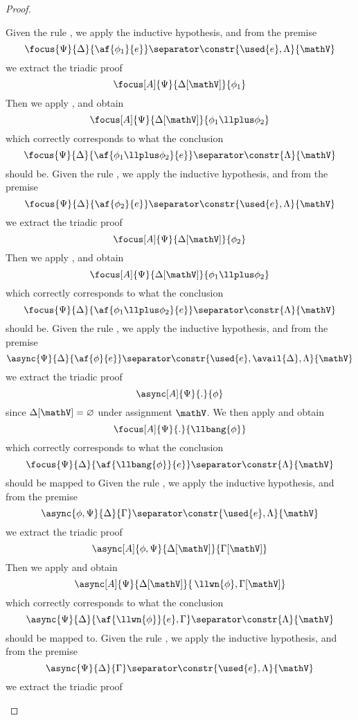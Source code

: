 \begin{proof}
\begin{itemize}
		\indCase{\displayplus[L]} Given the rule \derRule{\displayplus[L]}, we apply the inductive hypothesis, and from the premise
			$$ \focus{\Psi}{\Delta}{\af{\phi_1}{e}} \separator \constr{\used{e}, \Lambda}{\mathV}$$
			we extract the triadic proof
			$$ \focus[A]{\Psi}{\Delta[\mathV]}{\phi_1} $$
			Then we apply \derRule[A]{\displayplus[L]}, and obtain
			$$ \focus[A]{\Psi}{\Delta[\mathV]}{\phi_1 \llplus \phi_2} $$
			which correctly corresponds to what the conclusion
			$$ \focus{\Psi}{\Delta}{\af{\phi_1 \llplus \phi_2}{e}} \separator \constr{\Lambda}{\mathV} $$
			should be.
		\indCase{\displayplus[R]} Given the rule \derRule{\displayplus[R]}, we apply the inductive hypothesis, and from the premise
			$$ \focus{\Psi}{\Delta}{\af{\phi_2}{e}} \separator \constr{\used{e}, \Lambda}{\mathV}$$
			we extract the triadic proof
			$$ \focus[A]{\Psi}{\Delta[\mathV]}{\phi_2} $$
			Then we apply \derRule[A]{\displayplus[R]}, and obtain
			$$ \focus[A]{\Psi}{\Delta[\mathV]}{\phi_1 \llplus \phi_2} $$
			which correctly corresponds to what the conclusion
			$$ \focus{\Psi}{\Delta}{\af{\phi_1 \llplus \phi_2}{e}} \separator \constr{\Lambda}{\mathV} $$
			should be.
		\indCase{\displaybang} Given the rule \derRule{\displaybang}, we apply the inductive hypothesis, and from the premise
			$$ \async{\Psi}{\Delta}{\af{\phi}{e}} \separator \constr{\used{e}, \avail{\Delta}, \Lambda}{\mathV} $$
			we extract the triadic proof
			$$ \async[A]{\Psi}{.}{\phi} $$
			since $\Delta[\mathV] = \varnothing$ under assignment $\mathV$.
			We then apply \derRule[A]{\displaybang} and obtain
			$$ \focus[A]{\Psi}{.}{\llbang{\phi}} $$
			which correctly corresponds to what the conclusion 
			$$ \focus{\Psi}{\Delta}{\af{\llbang{\phi}}{e}} \separator \constr{\Lambda}{\mathV} $$
			should be mapped to
		\indCase{\displaywn} Given the rule \derRule{\displaywn}, we apply the inductive hypothesis, and from the premise
			$$ \async{\phi, \Psi}{\Delta}{\Gamma} \separator \constr{\used{e}, \Lambda}{\mathV} $$
			we extract the triadic proof
			$$ \async[A]{\phi, \Psi}{\Delta[\mathV]}{\Gamma[\mathV]}$$
			Then we apply \derRule[A]{\displaywn} and obtain
			$$ \async[A]{\Psi}{\Delta[\mathV]}{\,\llwn{\phi}, \Gamma[\mathV]} $$
			which correctly corresponds to what the conclusion
			$$ \async{\Psi}{\Delta}{\af{\llwn{\phi}}{e}, \Gamma} \separator \constr{\Lambda}{\mathV} $$
			should be mapped to.
		\indCase{\displaybot} Given the rule \derRule{\displaybot}, we apply the inductive hypothesis, and from the premise
			$$ \async{\Psi}{\Delta}{\Gamma} \separator \constr{\used{e}, \Lambda}{\mathV} $$
			we extract the triadic proof

\end{itemize}
\end{proof}
